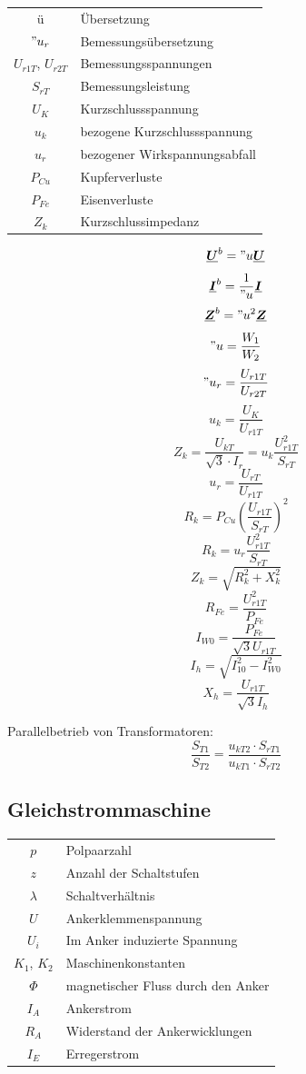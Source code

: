 \documentclass[9pt,a4paper]{scrartcl}
\renewcommand{\vec}[1]{\ensuremath{\underline{\boldsymbol {#1}}}}
\begin{document}
\begin{multicols}{3}
		\begin{tabular}{cl}
		ü & Übersetzung \\
		$"u_r$ & Bemessungsübersetzung \\
		$U_{r1T}$, $U_{r2T}$ & Bemessungsspannungen \\
		$S_{rT}$ & Bemessungsleistung \\
		$U_{K}$ & Kurzschlussspannung \\
		$u_k$ & bezogene Kurzschlussspannung \\
		$u_r$ & bezogener Wirkspannungsabfall \\
		$P_{Cu}$ & Kupferverluste \\
		$P_{Fe}$ & Eisenverluste \\
		$Z_k$ & Kurzschlussimpedanz
		\end{tabular}

		\[\vec U^b = "u \vec U\]
		\[\vec I^b = \frac{1}{"u} \vec I\]
		\[\vec Z^b = "u^2 \vec Z\]
		\["u = \frac{W_1}{W_2}\]
		\["u_r = \frac{U_{r1T}}{U_{r2T}}\]
		\[u_k = \frac{U_{K}}{U_{r1T}}\]
		\[Z_k = \frac{U_{kT}}{\sqrt{3}\cdot I_r} = u_k \frac{U_{r1T}^2}{S_{rT}}\]
		\[u_r = \frac{U_{rT}}{U_{r1T}}\]
		\[R_k = P_{Cu} \left( \frac{U_{r1T}}{S_{rT}} \right)^2\]
		\[R_k = u_r \frac{U_{r1T}^2}{S_{rT}}\]
		\[Z_k = \sqrt{R_k^2 + X_k^2}\]
		\[R_{Fe} = \frac{U_{r1T}^2}{P_{Fe}}\]
		\[I_{W0} = \frac{P_{Fe}}{\sqrt{3} U_{r1T}}\]
		\[I_h = \sqrt{I_{10}^2 - I_{W0}^2}\]
		\[X_h = \frac{U_{r1T}}{\sqrt{3} I_h}\]
		
		Parallelbetrieb von Transformatoren:
		\[\frac{S_{T1}}{S_{T2}} = \frac{u_{kT2} \cdot S_{rT1}}{u_{kT1} \cdot S_{rT2}}\]
	
		\subsection{Gleichstrommaschine}
		
		\begin{tabular}{cl}
		$p$ & Polpaarzahl \\
		$z$ & Anzahl der Schaltstufen \\
		$\lambda$ & Schaltverhältnis \\
		$U$ & Ankerklemmenspannung \\
		$U_i$ & Im Anker induzierte Spannung \\
		$K_1$, $K_2$ & Maschinenkonstanten \\
		$\Phi$ & magnetischer Fluss durch den Anker \\
		$I_A$ & Ankerstrom \\
		$R_A$ & Widerstand der Ankerwicklungen \\
		$I_E$ & Erregerstrom
		\end{tabular}
		

\end{multicols}
\end{document}
